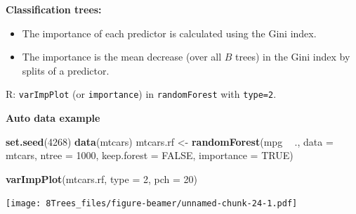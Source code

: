 \documentclass[10pt,ignorenonframetext,]{beamer}
\newenvironment{Shaded}{\begin{snugshade}}{\end{snugshade}}
\newcommand{\KeywordTok}[1]{\textcolor[rgb]{0.13,0.29,0.53}{\textbf{#1}}}
\newcommand{\DataTypeTok}[1]{\textcolor[rgb]{0.13,0.29,0.53}{#1}}
\newcommand{\DecValTok}[1]{\textcolor[rgb]{0.00,0.00,0.81}{#1}}
\newcommand{\StringTok}[1]{\textcolor[rgb]{0.31,0.60,0.02}{#1}}
\newcommand{\OtherTok}[1]{\textcolor[rgb]{0.56,0.35,0.01}{#1}}
\newcommand{\OperatorTok}[1]{\textcolor[rgb]{0.81,0.36,0.00}{\textbf{#1}}}
\newcommand{\NormalTok}[1]{#1}
\providecommand{\tightlist}{%
  \setlength{\itemsep}{0pt}\setlength{\parskip}{0pt}}
\begin{document}
\begin{frame}[fragile]

\textbf{Classification trees:}

\begin{itemize}
\tightlist
\item
  The importance of each predictor is calculated using the Gini index.
\item
  The importance is the mean decrease (over all \(B\) trees) in the Gini
  index by splits of a predictor.
\end{itemize}

R: \texttt{varImpPlot} (or \texttt{importance}) in \texttt{randomForest}
with \texttt{type=2}.

\end{frame}

\begin{frame}[fragile]

\textbf{Auto data example}

\begin{Shaded}
\begin{Highlighting}[]
\KeywordTok{set.seed}\NormalTok{(}\DecValTok{4268}\NormalTok{)}
\KeywordTok{data}\NormalTok{(mtcars)}
\NormalTok{mtcars.rf <-}\StringTok{ }\KeywordTok{randomForest}\NormalTok{(mpg }\OperatorTok{~}\StringTok{ }\NormalTok{., }\DataTypeTok{data =}\NormalTok{ mtcars, }\DataTypeTok{ntree =} \DecValTok{1000}\NormalTok{, }\DataTypeTok{keep.forest =} \OtherTok{FALSE}\NormalTok{, }
    \DataTypeTok{importance =} \OtherTok{TRUE}\NormalTok{)}
\end{Highlighting}
\end{Shaded}

\end{frame}

\begin{frame}[fragile]

\begin{Shaded}
\begin{Highlighting}[]
\KeywordTok{varImpPlot}\NormalTok{(mtcars.rf, }\DataTypeTok{type =} \DecValTok{2}\NormalTok{, }\DataTypeTok{pch =} \DecValTok{20}\NormalTok{)}
\end{Highlighting}
\end{Shaded}

\texttt{[image: 8Trees\_files/figure-beamer/unnamed-chunk-24-1.pdf]}

\end{frame}
\end{document}
